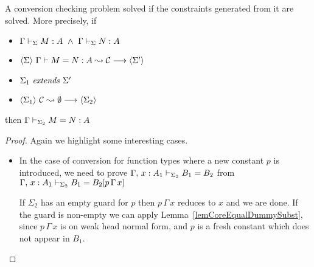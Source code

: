 \begin{lemma} \label{thmConvSound}
    A conversion checking problem solved if the constraints generated from it
    are solved. More precisely, if
    \begin{itemize}
	\item \( \HasTypeCS \Sigma \Gamma M A ~ \wedge ~
		 \HasTypeCS \Sigma \Gamma N A
	      \)
	\item $\ExplicitJudgement \Sigma {\Equal M N A \Cs} {\Sigma'}$
	\item $ \Extends {\Sigma_1} {\Sigma'}$
	\item $\ExplicitJudgement
		{\Sigma_1}
		{\CheckConstr \Cs \emptyset}
		{\Sigma_2}
	      $
    \end{itemize}
    then \( \EqualCS {\Sigma_2} \Gamma M N A \)
\end{lemma}

\begin{proof}
    Again we highlight some interesting cases.
    \begin{itemize}
	\item In the case of conversion for function types where a new constant $p$
	is introduced, we need to prove  $\EqualTypeCS {\Sigma_2} {\Ext
	\Gamma x : A_1} {B_1} {B_2}$ from $\EqualTypeCS {\Sigma_2} {\Ext \Gamma
	x : A_1} {B_1} {\SubstD {B_2} {p \, \Gamma \, x}}$

	If $\Sigma_2$ has an empty guard for $p$ then $p \,
	\Gamma \, x$ reduces to $x$ and we are done. If the guard is non-empty
	we can apply Lemma~\ref{lemCoreEqualDummySubst}, since $p \, \Gamma \,
	x$ is on weak head normal form, and $p$ is a fresh constant which does
	not appear in $B_1$.
    \end{itemize}
\end{proof}



